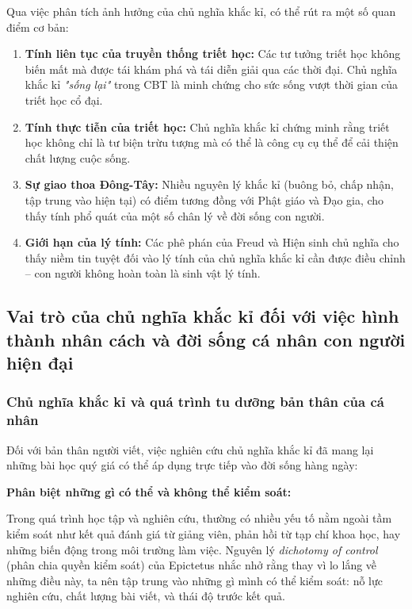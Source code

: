 Qua việc phân tích ảnh hưởng của chủ nghĩa khắc kỉ, có thể rút ra một số quan điểm cơ bản:

\begin{enumerate}[leftmargin=1.5cm]
    \item \textbf{Tính liên tục của truyền thống triết học:} Các tư tưởng triết học không biến mất mà được tái khám phá và tái diễn giải qua các thời đại. Chủ nghĩa khắc kỉ \textit{"sống lại"} trong CBT là minh chứng cho sức sống vượt thời gian của triết học cổ đại.
    
    \item \textbf{Tính thực tiễn của triết học:} Chủ nghĩa khắc kỉ chứng minh rằng triết học không chỉ là tư biện trừu tượng mà có thể là công cụ cụ thể để cải thiện chất lượng cuộc sống.
    
    \item \textbf{Sự giao thoa Đông-Tây:} Nhiều nguyên lý khắc kỉ (buông bỏ, chấp nhận, tập trung vào hiện tại) có điểm tương đồng với Phật giáo và Đạo gia, cho thấy tính phổ quát của một số chân lý về đời sống con người.
    
    \item \textbf{Giới hạn của lý tính:} Các phê phán của Freud và Hiện sinh chủ nghĩa cho thấy niềm tin tuyệt đối vào lý tính của chủ nghĩa khắc kỉ cần được điều chỉnh – con người không hoàn toàn là sinh vật lý tính.
\end{enumerate}

\subsection{Vai trò của chủ nghĩa khắc kỉ đối với việc hình thành nhân cách và đời sống cá nhân con người hiện đại}

\subsubsection{Chủ nghĩa khắc kỉ và quá trình tu dưỡng bản thân của cá nhân}

Đối với bản thân người viết, việc nghiên cứu chủ nghĩa khắc kỉ đã mang lại những bài học quý giá có thể áp dụng trực tiếp vào đời sống hàng ngày:

\textbf{Phân biệt những gì có thể và không thể kiểm soát:}

Trong quá trình học tập và nghiên cứu, thường có nhiều yếu tố nằm ngoài tầm kiểm soát như kết quả đánh giá từ giảng viên, phản hồi từ tạp chí khoa học, hay những biến động trong môi trường làm việc. Nguyên lý \textit{dichotomy of control} (phân chia quyền kiểm soát) của Epictetus nhắc nhở rằng thay vì lo lắng về những điều này, ta nên tập trung vào những gì mình có thể kiểm soát: nỗ lực nghiên cứu, chất lượng bài viết, và thái độ trước kết quả.


